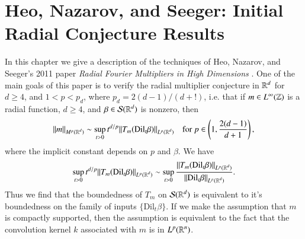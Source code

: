 















\chapter{Heo, Nazarov, and Seeger: Initial Radial Conjecture Results} \label{HeoNazarovSeeger}

In this chapter we give a description of the techniques of Heo, Nazarov, and Seeger's 2011 paper \emph{Radial Fourier Multipliers in High Dimensions} \cite{HeoandNazarovandSeeger}. One of the main goals of this paper is to verify the radial multiplier conjecture in $\operatorname{\mathbb{R}}^d$ for $d \geq 4$, and $1 < p < p_d$, where $p_d = 2(d-1)/(d+!)$, i.e. that if $m \in L^\infty(\operatorname{\mathbb{Z}})$ is a radial function, $d \geq 4$, and $\beta \in \mathcal{S}(\operatorname{\mathbb{R}}^d)$ is nonzero, then
%
\[ \| m \|_{M^p(\operatorname{\mathbb{R}}^d)} \sim \sup_{t > 0} t^{d/p} \| T_m(\text{Dil}_t \beta) \|_{L^p(\operatorname{\mathbb{R}}^d)} \quad \text{for}\ p \in \left(1, \frac{2(d-1)}{d+1} \right), \]
%
where the implicit constant depends on $p$ and $\beta$. We have
%
\[ \sup_{t > 0} t^{d/p} \| T_m(\text{Dil}_t \beta) \|_{L^p(\operatorname{\mathbb{R}}^d)} \sim \sup_{t > 0} \frac{\| T_m(\text{Dil}_t \beta) \|_{L^p(\operatorname{\mathbb{R}}^d)}}{\| \text{Dil}_t \beta \|_{L^p(\operatorname{\mathbb{R}}^d)}}. \]
%
Thus we find that the boundedness of $T_m$ on $\mathcal{S}(\operatorname{\mathbb{R}}^d)$ is equivalent to it's boundedness on the family of inputs $\{ \text{Dil}_t \beta \}$. If we make the assumption that $m$ is compactly supported, then the assumption is equivalent to the fact that the convolution kernel $k$ associated with $m$ is in $L^p(\operatorname{\mathbb{R}}^n)$.

